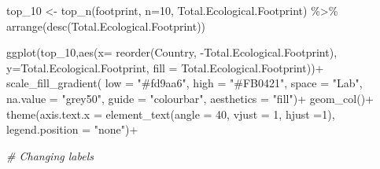\documentclass[
]{article}
\newenvironment{Shaded}{\begin{snugshade}}{\end{snugshade}}
\newcommand{\AttributeTok}[1]{\textcolor[rgb]{0.77,0.63,0.00}{#1}}
\newcommand{\CommentTok}[1]{\textcolor[rgb]{0.56,0.35,0.01}{\textit{#1}}}
\newcommand{\DecValTok}[1]{\textcolor[rgb]{0.00,0.00,0.81}{#1}}
\newcommand{\FunctionTok}[1]{\textcolor[rgb]{0.00,0.00,0.00}{#1}}
\newcommand{\NormalTok}[1]{#1}
\newcommand{\OtherTok}[1]{\textcolor[rgb]{0.56,0.35,0.01}{#1}}
\newcommand{\SpecialCharTok}[1]{\textcolor[rgb]{0.00,0.00,0.00}{#1}}
\newcommand{\StringTok}[1]{\textcolor[rgb]{0.31,0.60,0.02}{#1}}
\begin{document}
\begin{Shaded}
\begin{Highlighting}[]
\NormalTok{top\_10 }\OtherTok{\textless{}{-}} \FunctionTok{top\_n}\NormalTok{(footprint, }\AttributeTok{n=}\DecValTok{10}\NormalTok{, Total.Ecological.Footprint) }\SpecialCharTok{\%\textgreater{}\%} 
  \FunctionTok{arrange}\NormalTok{(}\FunctionTok{desc}\NormalTok{(Total.Ecological.Footprint))}


\FunctionTok{ggplot}\NormalTok{(top\_10,}\FunctionTok{aes}\NormalTok{(}\AttributeTok{x=} \FunctionTok{reorder}\NormalTok{(Country, }\SpecialCharTok{{-}}\NormalTok{Total.Ecological.Footprint), }\AttributeTok{y=}\NormalTok{Total.Ecological.Footprint, }\AttributeTok{fill =}\NormalTok{ Total.Ecological.Footprint))}\SpecialCharTok{+}
  \FunctionTok{scale\_fill\_gradient}\NormalTok{(}
    \AttributeTok{low =} \StringTok{"\#fd9aa6"}\NormalTok{,}
    \AttributeTok{high =} \StringTok{"\#FB0421"}\NormalTok{,}
    \AttributeTok{space =} \StringTok{"Lab"}\NormalTok{,}
    \AttributeTok{na.value =} \StringTok{"grey50"}\NormalTok{,}
    \AttributeTok{guide =} \StringTok{"colourbar"}\NormalTok{,}
    \AttributeTok{aesthetics =} \StringTok{"fill"}\NormalTok{)}\SpecialCharTok{+} 
  \FunctionTok{geom\_col}\NormalTok{()}\SpecialCharTok{+}
  \FunctionTok{theme}\NormalTok{(}\AttributeTok{axis.text.x =} \FunctionTok{element\_text}\NormalTok{(}\AttributeTok{angle =} \DecValTok{40}\NormalTok{, }\AttributeTok{vjust =} \DecValTok{1}\NormalTok{, }\AttributeTok{hjust =}\DecValTok{1}\NormalTok{),}
        \AttributeTok{legend.position =} \StringTok{"none"}\NormalTok{)}\SpecialCharTok{+}
  
  \CommentTok{\# Changing labels}
  

\end{Highlighting}
\end{Shaded}
\end{document}
